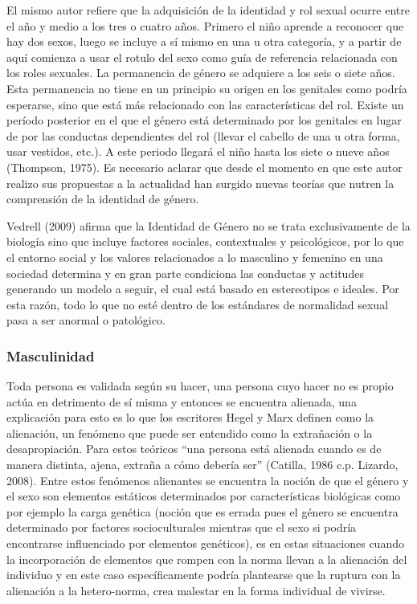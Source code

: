 El mismo autor refiere que la adquisición de la identidad y rol sexual ocurre
entre el año y medio a los tres o cuatro años.
Primero el niño aprende a reconocer que hay dos sexos, luego se incluye a sí
mismo en una u otra categoría, y a partir de aquí comienza a usar el rotulo del
sexo como guía de referencia relacionada con los roles sexuales.
La permanencia de género se adquiere a los seis o siete años.
Esta permanencia no tiene en un principio su origen en los genitales como podría
esperarse, sino que está más relacionado con las características del rol.
Existe un período posterior en el que el género está determinado por los
genitales en lugar de por las conductas dependientes del rol (llevar el cabello
de una u otra forma, usar vestidos, etc.).
A este periodo llegará el niño hasta los siete o nueve años (Thompson, 1975).
Es necesario aclarar que desde el momento en que este autor realizo sus
propuestas a la actualidad han surgido nuevas teorías que nutren la comprensión
de la identidad de género.

Vedrell (2009) afirma que la Identidad de Género no se trata exclusivamente de
la biología sino que incluye factores sociales, contextuales y psicológicos, por
lo que el entorno social y los valores relacionados a lo masculino y femenino en
una sociedad determina y en gran parte condiciona las conductas y actitudes
generando un modelo a seguir, el cual está basado en estereotipos e ideales.
Por esta razón, todo lo que no esté dentro de los estándares de normalidad
sexual pasa a ser anormal o patológico.

\subsubsection{Masculinidad}
Toda persona es validada según su hacer, una persona cuyo hacer no es propio
actúa en detrimento de sí misma y entonces se encuentra alienada, una
explicación para esto es lo que los escritores Hegel y Marx definen como la
alienación, un fenómeno que puede ser entendido como la extrañación o la
desapropiación.
Para estos teóricos “una persona está alienada cuando es de manera distinta,
ajena, extraña a cómo debería ser” (Catilla, 1986 c.p. Lizardo, 2008).
Entre estos fenómenos alienantes se encuentra la noción de que el género y el
sexo son elementos estáticos determinados por características biológicas como
por ejemplo la carga genética (noción que es errada pues el género se encuentra
determinado por factores socioculturales mientras que el sexo si podría
encontrarse influenciado por elementos genéticos), es en estas situaciones
cuando la incorporación de elementos que rompen con la norma llevan a la
alienación del individuo y en este caso específicamente podría plantearse que la
ruptura con la alienación a la hetero-norma, crea malestar en la forma
individual de vivirse.

